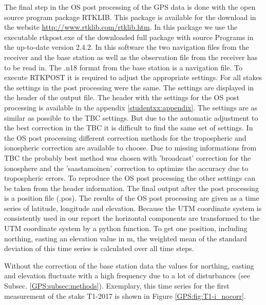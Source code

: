 The final step in the OS post processing of the GPS data is done with the open source program package RTKLIB.
This package is available for the download in the website \url{http://www.rtklib.com/rtklib.htm}.
In this package we use the executable rtkpost.exe of the downloaded full package with source Programs in the up-to-date version 2.4.2.
In this software the two navigation files from the receiver and the base station as well as the observation file from the receiver has to be read in.
The .n18 format from the base station is a navigation file.
To execute RTKPOST it is required to adjust the appropriate settings.
For all stakes the settings in the post processing were the same.
The settings are displayed in the header of the output file.
The header with the settings for the OS post processing is available in the appendix \ref{studentxx:appendix}.
The settings are as similar as possible to the TBC settings.
But due to the automatic adjustment to the best correction in the TBC it is difficult to find the same set of settings.
In the OS post processing different correction methods for the tropospheric and ionospheric correction are available to choose. 
Due to missing informations from TBC the probably best method was chosen with 'broadcast' correction for the ionosphere and the 'saastamoinen' correction to optimize the accuracy due to tropospheric errors. 
To reproduce the OS post processing the other settings can be taken from the header information. 
The final output after the post processing is a position file (.pos). 
The results of the OS post processing are given as a time series of latitude, longitude and elevation.
Because the UTM coordinate system is consistently used in our report the horizontal components are transformed to the UTM coordinate system by a python function.
To get one position, including northing, easting an elevation value in m, the weighted mean of the standard deviation of this time series is calculated over all time steps.

Without the correction of the base station data the values for northing, easting and elevation fluctuate with a high frequency due to a lot of disturbances (see Subsec. \ref{GPS:subsec:methods}). 
Exemplary, this time series for the first measurement of the stake T1-2017 is shown in Figure \ref{GPS:fig:T1-i_nocorr}.

